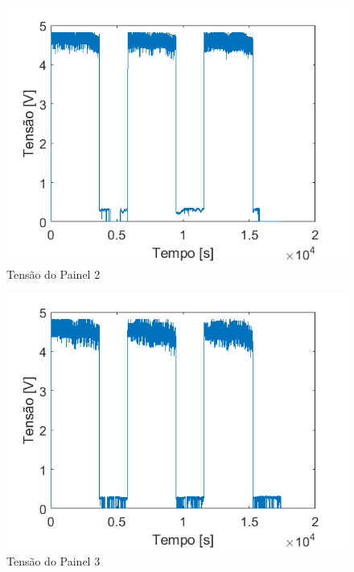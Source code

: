 \begin{figure}[!htpb]
\begin{center}
\includegraphics[scale=0.5]{figures/testPanel2Voltage.png}
\caption{Tensão do Painel 2}
\label{figura_teste_tensao_painel2}
\end{center}
\end{figure}

\begin{figure}[!htpb]
\begin{center}
\includegraphics[scale=0.5]{figures/testPanel3Voltage.png}
\caption{Tensão do Painel 3}
\label{figura_teste_tensao_painel3}
\end{center}
\end{figure}

